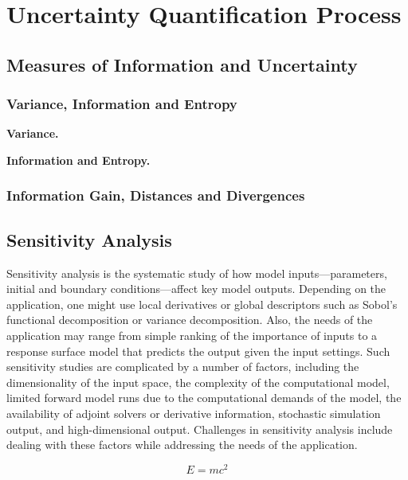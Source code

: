 \chapter[Uncertainty Quantification Process]{Uncertainty Quantification Process}\label{cap_uq_process}

\section[Measures of Information and Uncertainty]{Measures of Information and Uncertainty}

\subsection{Variance, Information and Entropy}

\textbf{Variance.} 

\textbf{Information and Entropy.}

\subsection{Information Gain, Distances and Divergences}

\section{Sensitivity Analysis}
Sensitivity analysis is the systematic study of how model inputs—parameters, initial and boundary conditions—affect key model outputs. Depending on the application, one might use local derivatives or global descriptors such as Sobol’s functional decomposition or variance decomposition. Also, the needs of the application may range from simple ranking of the importance of inputs to a response surface model that predicts the output given the input settings. Such sensitivity studies are complicated by a number of factors, including the dimensionality of the input space, the complexity of the computational model, limited forward model runs due to the computational demands of the model, the availability of adjoint solvers or derivative information, stochastic simulation output, and high-dimensional output. Challenges in sensitivity analysis include dealing with these factors while addressing the needs of the application. \cite{DEnergy2009}

\begin{equation}
E=mc^2
\end{equation}